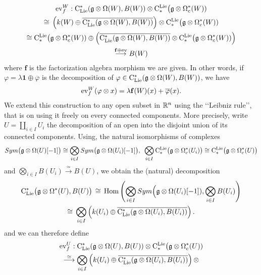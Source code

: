 \documentclass[11pt]{amsart}
\numberwithin{equation}{section}
\begin{document}
{\begin{multline}\label{eq:defevforconnected}
 {\rm ev}_f^W:   {\rm C}_{\rm Lie}^* (\mathfrak g\otimes \Omega (W), B(W)) \otimes {\rm C}^{\rm Lie}_*\big(\mathfrak g \otimes \Omega_c^* (W)) 
 \\ \cong \, \left( k(W) \oplus \overline{{\rm C}_{\rm Lie}^* (\mathfrak g\otimes \Omega (W), B(W))  }\right) 
 \otimes {\rm C}^{\rm Lie}_*\big(\mathfrak g \otimes \Omega_c^* (W))  \\ \cong
 {\rm C}^{\rm Lie}_*\big(\mathfrak g \otimes \Omega_c^* (W))  \oplus  \left(\overline{{\rm C}_{\rm Lie}^* (\mathfrak g\otimes \Omega (W), B(W))  }\otimes {\rm C}^{\rm Lie}_*\big(\mathfrak g \otimes \Omega_c^* (W)) 
 \right) \\
 \stackrel{ \mathbf{f}\oplus {\rm ev}}\longrightarrow  
 B(W)
\end{multline}
where $\mathbf{f}$ is the factorization algebra morphism  we are given.
In other words, if $\varphi = \lambda \mathbf{1} \oplus \overline{\varphi}$ is the decomposition of $\varphi \in  {\rm C}_{\rm Lie}^* (\mathfrak g\otimes \Omega (W), B(W)) $,
we have 
\[ {\rm ev}_f^W(\varphi\otimes x)= \lambda \mathbf{f}(W)(x) + \overline{\varphi}(x). \]
We extend this construction  to any 
 open subset in $\mathbb R^n$ using the \lq\lq{}Leibniz rule\rq\rq{}, that is on using it freely on every connected components. 
 More precisely, 
  write $U=\coprod_{i\in I} U_i$ the decomposition of an open into the  disjoint union 
of its connected components. Using, the natural isomorphisms of complexes 
\[Sym\big(\mathfrak g \otimes \Omega (U)[-1]\big) 
\cong \bigotimes\limits_{i\in I} Sym\big(\mathfrak g \otimes \Omega ( U_i)[-1]\big), \mbox{  } 
\bigotimes_{i\in I} {\rm C}^{\rm Lie}_*\big(\mathfrak g \otimes \Omega_c^* (U_i)\big) \cong
{\rm C}^{\rm Lie}_*\big(\mathfrak g \otimes \Omega_c^* (U)\big)\] and
$\bigotimes_{i\in I} B(U_i) 
\stackrel{\simeq}\longrightarrow B(U)$, we obtain the 
 (natural) decomposition 
\begin{multline}\label{eq:defgraduationoncentralizernonconnected}
 {\rm C}_{\rm Lie}^*\big(\mathfrak g\otimes \Omega^*(U), B(U)\big)  \, \cong \, 
 {\rm Hom}\left(\bigotimes\limits_{i\in I} Sym\Big(\mathfrak g\otimes \Omega (U_i)[-1]), 
 \bigotimes\limits_{i\in I} B(U_i)\right) \\ \cong \, 
 \bigotimes\limits_{i\in I}\left( k(U_i) \oplus \overline{{\rm C}_{\rm Lie}^* (\mathfrak g\otimes \Omega (U_i), B(U_i))  }\right).
\end{multline}
and we can therefore define 
\begin{multline}\label{eq:defineevf}
 \ev_f^U: \clies (\fg\otimes \Omega (U), B(U)) \otimes \cliels\big(\fg \otimes \Omega_c^* (U)) 
 \\ \stackrel{\simeq}\longrightarrow  
\bigotimes\limits_{i\in I}\left( k(U_i) \oplus \overline{\clies (\fg\otimes \Omega (U_i), B(U_i))  }\right) \otimes 

\end{multline}}
\end{document}
